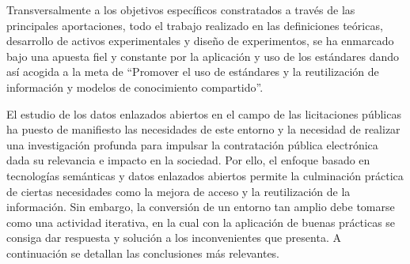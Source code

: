\documentclass[a4paper,final,11pt,fleqn,twoside]{book}  %
\begin{document}
Transversalmente a los objetivos específicos constratados a través de las principales aportaciones, todo el trabajo 
realizado en las definiciones teóricas, desarrollo de activos experimentales y diseño de experimentos, se ha enmarcado bajo una apuesta fiel y constante por la aplicación y uso de los estándares 
dando así acogida a la meta de ``Promover el uso de estándares y la reutilización de  información y modelos de conocimiento compartido''.

El estudio de los datos enlazados abiertos en el campo de las licitaciones públicas ha puesto de manifiesto las necesidades 
de este entorno y la necesidad de realizar una investigación profunda para impulsar la contratación pública electrónica dada 
su relevancia e impacto en la sociedad. Por ello, el enfoque basado en tecnologías semánticas y datos enlazados abiertos 
permite la culminación práctica de ciertas necesidades como la mejora de acceso y la reutilización de la información. Sin embargo, 
la conversión de un entorno tan amplio debe tomarse como una actividad iterativa, en la cual con la aplicación de buenas 
prácticas se consiga dar respuesta y solución a los inconvenientes que presenta. A continuación se detallan las conclusiones 
más relevantes.
\end{document}
